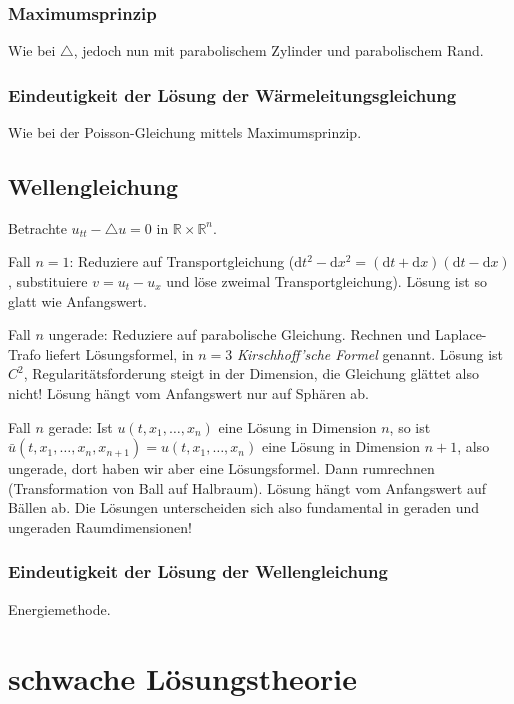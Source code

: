 \documentclass[11pt,a4paper]{scrartcl}
\newcommand{\R}{\mathbb{R}} %
\theoremstyle{plain}
\theoremstyle{definition}
\theoremstyle{remark}
\begin{document}
\subsubsection{Maximumsprinzip}

Wie bei $\triangle$, jedoch nun mit parabolischem Zylinder und parabolischem Rand.

\subsubsection{Eindeutigkeit der Lösung der Wärmeleitungsgleichung}

Wie bei der Poisson-Gleichung mittels Maximumsprinzip.

\subsection{Wellengleichung}

Betrachte $u_{tt}-\triangle u = 0$ in $\R\times \R^n$. 

Fall $n=1$: Reduziere auf Transportgleichung ($\mathrm{d}t^2-\mathrm{d}x^2=(\mathrm{d}t+\mathrm{d}x)(\mathrm{d}t-\mathrm{d}x)$, substituiere $v=u_t-u_x$ und löse zweimal Transportgleichung). Lösung ist so glatt wie Anfangswert. 

Fall $n$ ungerade: Reduziere auf parabolische Gleichung. Rechnen und Laplace-Trafo liefert Lösungsformel, in $n=3$ \emph{Kirschhoff'sche Formel} genannt. Lösung ist $C^2$, Regularitätsforderung steigt in der Dimension, die Gleichung glättet also nicht! Lösung hängt vom Anfangswert nur auf Sphären ab. 

Fall $n$ gerade: Ist $u(t,x_1,\dots,x_n)$ eine Lösung in Dimension $n$, so ist $\bar u(t,x_1,\dots,x_n,x_{n+1})=u(t,x_1,\dots,x_n)$ eine Lösung in Dimension $n+1$, also ungerade, dort haben wir aber eine Lösungsformel. Dann rumrechnen (Transformation von Ball auf Halbraum). Lösung hängt vom Anfangswert auf Bällen ab. Die Lösungen unterscheiden sich also fundamental in geraden und ungeraden Raumdimensionen!

\subsubsection{Eindeutigkeit der Lösung der Wellengleichung}

Energiemethode.

\section{schwache Lösungstheorie}
\end{document}
